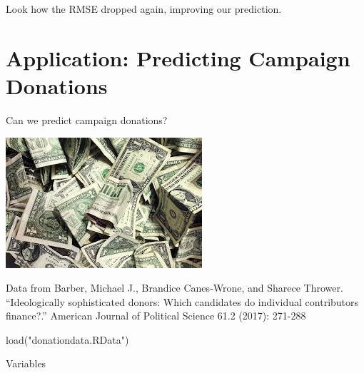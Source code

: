 \documentclass[
  letterpaper,
  DIV=11,
  numbers=noendperiod]{scrreprt}
\newenvironment{Shaded}{\begin{snugshade}}{\end{snugshade}}
\newcommand{\FunctionTok}[1]{\textcolor[rgb]{0.28,0.35,0.67}{#1}}
\newcommand{\NormalTok}[1]{\textcolor[rgb]{0.00,0.23,0.31}{#1}}
\newcommand{\StringTok}[1]{\textcolor[rgb]{0.13,0.47,0.30}{#1}}
\begin{document}
Look how the RMSE dropped again, improving our prediction.

\hypertarget{application-predicting-campaign-donations}{%
\section{Application: Predicting Campaign
Donations}\label{application-predicting-campaign-donations}}

Can we predict campaign donations?

\includegraphics{images/moneymoney.jpeg}

Data from Barber, Michael J., Brandice Canes‐Wrone, and Sharece Thrower.
``Ideologically sophisticated donors: Which candidates do individual
contributors finance?.'' American Journal of Political Science 61.2
(2017): 271-288

\begin{Shaded}
\begin{Highlighting}[]
\FunctionTok{load}\NormalTok{(}\StringTok{"donationdata.RData"}\NormalTok{)}
\end{Highlighting}
\end{Shaded}

Variables
\end{document}
